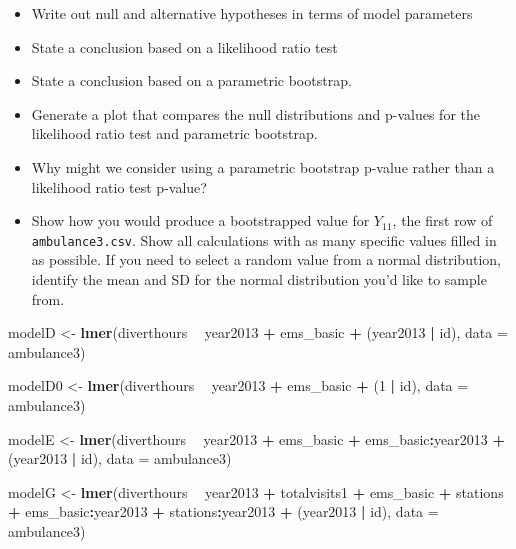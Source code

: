 \documentclass[
]{krantz}
\newenvironment{Shaded}{\begin{snugshade}}{\end{snugshade}}
\newcommand{\DataTypeTok}[1]{\textcolor[rgb]{0.27,0.27,0.27}{#1}}
\newcommand{\DecValTok}[1]{\textcolor[rgb]{0.06,0.06,0.06}{#1}}
\newcommand{\KeywordTok}[1]{\textcolor[rgb]{0.27,0.27,0.27}{\textbf{#1}}}
\newcommand{\NormalTok}[1]{#1}
\newcommand{\OperatorTok}[1]{\textcolor[rgb]{0.43,0.43,0.43}{\textbf{#1}}}
\newcommand{\StringTok}[1]{\textcolor[rgb]{0.5,0.5,0.5}{#1}}
\providecommand{\tightlist}{%
  \setlength{\itemsep}{0pt}\setlength{\parskip}{0pt}}
\begin{document}
\begin{enumerate}
  \begin{itemize}
  \tightlist
  \item
    Write out null and alternative hypotheses in terms of model parameters
  \item
    State a conclusion based on a likelihood ratio test
  \item
    State a conclusion based on a parametric bootstrap.\\
  \item
    Generate a plot that compares the null distributions and p-values for the likelihood ratio test and parametric bootstrap.
  \item
    Why might we consider using a parametric bootstrap p-value rather than a likelihood ratio test p-value?
  \item
    Show how you would produce a bootstrapped value for \(Y_{11}\), the first row of \texttt{ambulance3.csv}. Show all calculations with as many specific values filled in as possible. If you need to select a random value from a normal distribution, identify the mean and SD for the normal distribution you'd like to sample from.
  \end{itemize}
\end{enumerate}

\begin{Shaded}
\begin{Highlighting}[]
\NormalTok{modelD <-}\StringTok{ }\KeywordTok{lmer}\NormalTok{(diverthours }\OperatorTok{~}\StringTok{ }\NormalTok{year2013 }\OperatorTok{+}\StringTok{ }\NormalTok{ems_basic }\OperatorTok{+}\StringTok{ }
\StringTok{  }\NormalTok{(year2013 }\OperatorTok{|}\StringTok{ }\NormalTok{id), }\DataTypeTok{data =}\NormalTok{ ambulance3)}

\NormalTok{modelD0 <-}\StringTok{ }\KeywordTok{lmer}\NormalTok{(diverthours }\OperatorTok{~}\StringTok{ }\NormalTok{year2013 }\OperatorTok{+}\StringTok{ }\NormalTok{ems_basic }\OperatorTok{+}\StringTok{ }
\StringTok{  }\NormalTok{(}\DecValTok{1} \OperatorTok{|}\StringTok{ }\NormalTok{id), }\DataTypeTok{data =}\NormalTok{ ambulance3)}

\NormalTok{modelE <-}\StringTok{ }\KeywordTok{lmer}\NormalTok{(diverthours }\OperatorTok{~}\StringTok{ }\NormalTok{year2013 }\OperatorTok{+}\StringTok{ }\NormalTok{ems_basic }\OperatorTok{+}
\StringTok{  }\NormalTok{ems_basic}\OperatorTok{:}\NormalTok{year2013 }\OperatorTok{+}\StringTok{ }\NormalTok{(year2013 }\OperatorTok{|}\StringTok{ }\NormalTok{id), }\DataTypeTok{data =}\NormalTok{ ambulance3)}

\NormalTok{modelG <-}\StringTok{ }\KeywordTok{lmer}\NormalTok{(diverthours }\OperatorTok{~}\StringTok{ }\NormalTok{year2013 }\OperatorTok{+}\StringTok{ }\NormalTok{totalvisits1 }\OperatorTok{+}\StringTok{ }
\StringTok{  }\NormalTok{ems_basic }\OperatorTok{+}\StringTok{ }\NormalTok{stations }\OperatorTok{+}\StringTok{ }\NormalTok{ems_basic}\OperatorTok{:}\NormalTok{year2013 }\OperatorTok{+}\StringTok{ }
\StringTok{  }\NormalTok{stations}\OperatorTok{:}\NormalTok{year2013 }\OperatorTok{+}\StringTok{ }\NormalTok{(year2013 }\OperatorTok{|}\StringTok{ }\NormalTok{id), }\DataTypeTok{data =}\NormalTok{ ambulance3)}
\end{Highlighting}
\end{Shaded}
\end{document}
